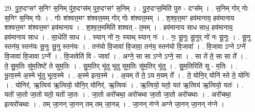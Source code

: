 \documentclass[17pt]{extarticle}
\begin{document}
29. पु॒रु॒दꣳसꣳ॑ स॒निꣳ स॒निम् पु॑रु॒दꣳस॑म् पुरु॒दꣳसꣳ॑ स॒निम् । . पु॒रु॒दꣳस॒मिति॑ पुरु - दꣳस᳚म् । . स॒निम् गोर् गोः स॒निꣳ स॒निम् गोः । . गोः श॑श्वत्त॒मꣳ श॑श्वत्त॒मम् गोर् गोः श॑श्वत्त॒मम् । . श॒श्व॒त्त॒मꣳ हव॑मानाय॒ हव॑मानाय शश्वत्त॒मꣳ श॑श्वत्त॒मꣳ हव॑मानाय । . श॒श्व॒त्त॒ममिति॑ शश्वत् - त॒मम् । . हव॑मानाय साध साध॒ हव॑मानाय॒ हव॑मानाय साध । . सा॒धेति॑ साध । . स्यान् नो॑ नः॒ स्याथ् स्यान् नः॑ । . नः॒ सू॒नुः सू॒नुर् नो॑ नः सू॒नुः । . सू॒नु स्तन॑य॒ स्तन॑यः सू॒नुः सू॒नु स्तन॑यः । . तन॑यो वि॒जावा॑ वि॒जावा॒ तन॑य॒ स्तन॑यो वि॒जावा᳚ । . वि॒जावा ऽग्ने ऽग्ने॑ वि॒जावा॑ वि॒जावा ऽग्ने᳚ । . वि॒जावेति॑ वि - जावा᳚ । . अग्ने॒ सा सा ऽग्ने ऽग्ने॒ सा । . सा ते॑ ते॒ सा सा ते᳚ । . ते॒ सु॒म॒तिः सु॑म॒तिष्टे॑ ते सुम॒तिः । . सु॒म॒तिर् भू॑तु भूतु सुम॒तिः सु॑म॒तिर् भू॑तु । . सु॒म॒तिरिति॑ सु - म॒तिः । . भू॒त्व॒स्मे अ॒स्मे भू॑तु भूत्व॒स्मे । . अ॒स्मे इत्य॒स्मे । . अ॒यम् ते॑ ते॒ ऽय म॒यम् ते᳚ । . ते॒ योनि॒र् योनि॑ स्ते ते॒ योनिः॑ । . योनिर्॑. ऋ॒त्विय॑ ऋ॒त्वियो॒ योनि॒र् योनिर्॑. ऋ॒त्वियः॑ । . ऋ॒त्वियो॒ यतो॒ यत॑ ऋ॒त्विय॑ ऋ॒त्वियो॒ यतः॑ । . यतो॑ जा॒तो जा॒तो यतो॒ यतो॑ जा॒तः । . जा॒तो अरो॑चथा॒ अरो॑चथा जा॒तो जा॒तो अरो॑चथाः । . अरो॑चथा॒ इत्यरो॑चथाः । . तम् जा॒नन् जा॒नन् तम् तम् जा॒नन्न् । . जा॒नन् न॑ग्ने अग्ने जा॒नन् जा॒नन् न॑ग्ने । \newline
\end{document}
